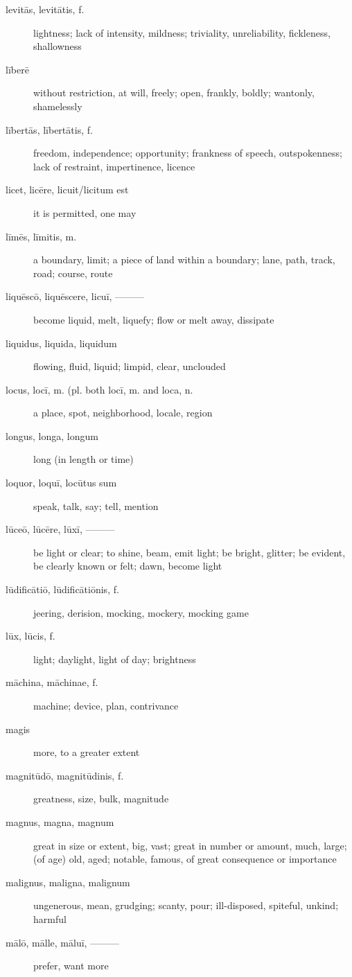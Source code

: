 \begin{description}
    \item[levitās, levitātis, f.] lightness; lack of intensity, mildness; triviality, unreliability, fickleness, shallowness
    \item[līberē] without restriction, at will, freely; open, frankly, boldly; wantonly, shamelessly
    \item[lībertās, lībertātis, f.] freedom, independence; opportunity; frankness of speech, outspokenness; lack of restraint, impertinence, licence
    \item[licet, licēre, licuit/licitum est] it is permitted, one may
    \item[līmēs, līmitis, m.] a boundary, limit; a piece of land within a boundary; lane, path, track, road; course, route
    \item[liquēscō, liquēscere, licuī, ———] become liquid, melt, liquefy; flow or melt away, dissipate
    \item[liquidus, liquida, liquidum] flowing, fluid, liquid; limpid, clear, unclouded
    \item[locus, locī, m. (pl. both locī, m. and loca, n.] a place, spot, neighborhood, locale, region
    \item[longus, longa, longum] long (in length or time)
    \item[loquor, loquī, locūtus sum] speak, talk, say; tell, mention
    \item[lūceō, lūcēre, lūxī, ———] be light or clear; to shine, beam, emit light; be bright, glitter; be evident, be clearly known or felt; dawn, become light
    \item[lūdificātiō, lūdificātiōnis, f.] jeering, derision, mocking, mockery, mocking game
    \item[lūx, lūcis, f.] light; daylight, light of day; brightness
    \item[māchina, māchinae, f.] machine; device, plan, contrivance
    \item[magis] more, to a greater extent
    \item[magnitūdō, magnitūdinis, f.] greatness, size, bulk, magnitude
    \item[magnus, magna, magnum] great in size or extent, big, vast; great in number or amount, much, large; (of age) old, aged; notable, famous, of great consequence or importance
    \item[malignus, maligna, malignum] ungenerous, mean, grudging; scanty, pour; ill-disposed, spiteful, unkind; harmful
    \item[mālō, mālle, māluī, ———] prefer, want more

\end{description}
